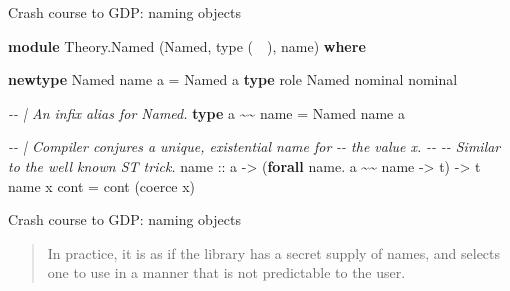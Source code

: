 \documentclass[
  9pt,
  ignorenonframetext,
]{beamer}
\newenvironment{Shaded}{}{}
\newcommand{\CommentTok}[1]{\textcolor[rgb]{0.38,0.63,0.69}{\textit{#1}}}
\newcommand{\DataTypeTok}[1]{\textcolor[rgb]{0.56,0.13,0.00}{#1}}
\newcommand{\KeywordTok}[1]{\textcolor[rgb]{0.00,0.44,0.13}{\textbf{#1}}}
\newcommand{\NormalTok}[1]{#1}
\newcommand{\OperatorTok}[1]{\textcolor[rgb]{0.40,0.40,0.40}{#1}}
\newcommand{\OtherTok}[1]{\textcolor[rgb]{0.00,0.44,0.13}{#1}}
\begin{document}
\begin{frame}[fragile]{Crash course to GDP: naming objects}
\protect\hypertarget{crash-course-to-gdp-naming-objects}{}
\begin{Shaded}
\begin{Highlighting}[]
\KeywordTok{module} \DataTypeTok{Theory.Named}\NormalTok{ (}\DataTypeTok{Named}\NormalTok{, type (~~)}\NormalTok{, name) }\KeywordTok{where}

\KeywordTok{newtype} \DataTypeTok{Named}\NormalTok{ name a }\OtherTok{=} \DataTypeTok{Named}\NormalTok{ a}
\KeywordTok{type}\NormalTok{ role }\DataTypeTok{Named}\NormalTok{ nominal nominal}

\CommentTok{{-}{-} | An infix alias for \textquotesingle{}Named\textquotesingle{}.}
\KeywordTok{type}\NormalTok{ a }\OperatorTok{\textasciitilde{}\textasciitilde{}}\NormalTok{ name }\OtherTok{=} \DataTypeTok{Named}\NormalTok{ name a}

\CommentTok{{-}{-} | Compiler conjures a unique, existential name for }
\CommentTok{{-}{-} the value \textquotesingle{}x\textquotesingle{}.}
\CommentTok{{-}{-} }
\CommentTok{{-}{-} Similar to the well known ST trick.}
\OtherTok{name ::}\NormalTok{ a }\OtherTok{{-}\textgreater{}}\NormalTok{ (}\KeywordTok{forall}\NormalTok{ name}\OperatorTok{.}\NormalTok{ a }\OperatorTok{\textasciitilde{}\textasciitilde{}}\NormalTok{ name }\OtherTok{{-}\textgreater{}}\NormalTok{ t) }\OtherTok{{-}\textgreater{}}\NormalTok{ t}
\NormalTok{name x cont }\OtherTok{=}\NormalTok{ cont (coerce x)}
\end{Highlighting}
\end{Shaded}














\end{frame}

\begin{frame}{Crash course to GDP: naming objects}
\protect\hypertarget{crash-course-to-gdp-naming-objects-2}{}
\begin{quote}
In practice, it is as if the library has a secret supply of names, and
selects one to use in a manner that is not predictable to the user.
\end{quote}
\end{frame}
\end{document}
